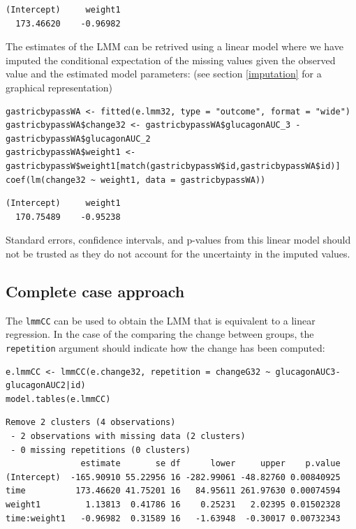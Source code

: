 \documentclass[12pt]{article}
\newcommand\Warning[1][3ex]{%
\renewcommand\stacktype{L}%
\scaleto{\stackon[1.3pt]{\color{red}$\triangle$}{\tiny\bfseries !}}{#1}%
\xspace
}
\begin{document}
\begin{verbatim}
(Intercept)     weight1 
  173.46620    -0.96982
\end{verbatim}


The estimates of the LMM can be retrived using a linear model where we
have imputed the conditional expectation of the missing values given
the observed value and the estimated model parameters: (see section
\ref{imputation} for a graphical representation)
\lstset{language=r,label= ,caption= ,captionpos=b,numbers=none}
\begin{lstlisting}
gastricbypassWA <- fitted(e.lmm32, type = "outcome", format = "wide")
gastricbypassWA$change32 <- gastricbypassWA$glucagonAUC_3 - gastricbypassWA$glucagonAUC_2
gastricbypassWA$weight1 <- gastricbypassW$weight1[match(gastricbypassW$id,gastricbypassWA$id)]
coef(lm(change32 ~ weight1, data = gastricbypassWA))
\end{lstlisting}

\begin{verbatim}
(Intercept)     weight1 
  170.75489    -0.95238
\end{verbatim}



\Warning Standard errors, confidence intervals, and p-values from this
linear model should not be trusted as they do not account for the
uncertainty in the imputed values.

\subsection{Complete case approach}
\label{sec:orgd20beb5}

The \texttt{lmmCC} can be used to obtain the LMM that is equivalent to a
linear regression. In the case of the comparing the change between
groups, the \texttt{repetition} argument should indicate how the change has
been computed:
\lstset{language=r,label= ,caption= ,captionpos=b,numbers=none}
\begin{lstlisting}
e.lmmCC <- lmmCC(e.change32, repetition = changeG32 ~ glucagonAUC3-glucagonAUC2|id)
model.tables(e.lmmCC)
\end{lstlisting}

\begin{verbatim}
Remove 2 clusters (4 observations) 
 - 2 observations with missing data (2 clusters) 
 - 0 missing repetitions (0 clusters)
               estimate       se df      lower     upper    p.value
(Intercept)  -165.90910 55.22956 16 -282.99061 -48.82760 0.00840925
time          173.46620 41.75201 16   84.95611 261.97630 0.00074594
weight1         1.13813  0.41786 16    0.25231   2.02395 0.01502328
time:weight1   -0.96982  0.31589 16   -1.63948  -0.30017 0.00732343
\end{verbatim}
\end{document}
